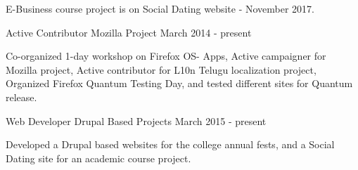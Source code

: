 \begin{cventries}
{\begin{cvitems}
            \item {E-Business course project is on Social Dating website - November 2017.}
        \end{cvitems}
    }
    \cventry
    {Active Contributor}
    {Mozilla Project}
    {}
    {March 2014 - present}
    {
        \begin{cvitems}
        \item {Co-organized 1-day workshop on Firefox OS- Apps, Active campaigner for Mozilla project, Active contributor for L10n Telugu localization project, Organized Firefox Quantum Testing Day, and tested different sites for Quantum release.}
        \end{cvitems}
    }
    \cventry
    {Web Developer}
    {Drupal Based Projects}
    {}{March 2015 - present}
    {
        \begin{cvitems}
        \item {Developed a Drupal based websites for the college annual fests, and a Social Dating site for an academic course project.}
        \end{cvitems}
    }
    
\end{cventries}
\clearpage